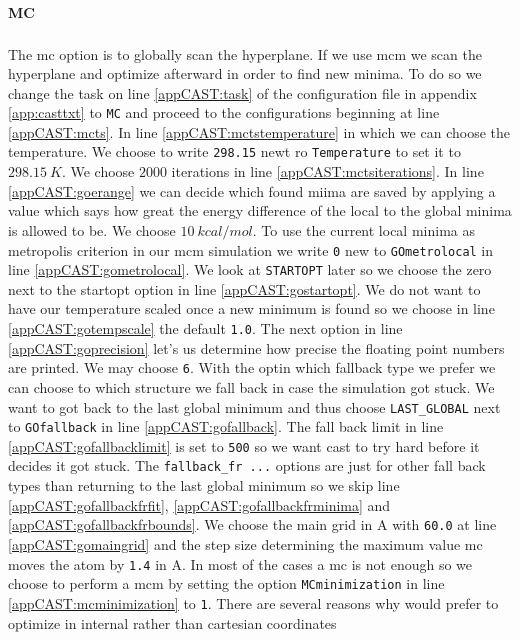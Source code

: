 \documentclass[a4paper,11pt]{scrartcl}
\newcommand{\myCite}[1]{\textsuperscript{\cite{#1}}}
\begin{document}
\paragraph{MC}The \ac{mc}\myCite{MC} option is to globally scan the hyperplane. If we use \ac{mcm} we scan the hyperplane and optimize afterward in order to find new minima. To do so we change the task on line \ref{appCAST:task} of the configuration file in appendix \ref{app:casttxt} to \texttt{MC} and proceed to the configurations beginning at line \ref{appCAST:mcts}. In line \ref{appCAST:mctstemperature} in which we can choose the temperature. We choose to write \texttt{298.15} newt ro \texttt{Temperature} to set it to $298.15~K$. We choose $2000$ iterations in line \ref{appCAST:mctsiterations}. In line \ref{appCAST:goerange} we can decide which found miima are saved by applying a value which says how great the energy difference of the local to the global minima is allowed to be. We choose $10~kcal/mol$. To use the current local minima as metropolis criterion in our \ac{mcm} simulation we write \texttt{0} new to \texttt{GOmetrolocal} in line \ref{appCAST:gometrolocal}. We look at \texttt{STARTOPT} later so we choose the zero next to the startopt option in line \ref{appCAST:gostartopt}. We do not want to have our temperature scaled once a new minimum is found so we choose in line \ref{appCAST:gotempscale} the default \texttt{1.0}. The next option in line \ref{appCAST:goprecision} let's us determine how precise the floating point numbers are printed. We may choose \texttt{6}. With the optin which fallback type we prefer we can choose to which structure we fall back in case the simulation got stuck. We want to got back to the last global minimum and thus choose \texttt{LAST\_GLOBAL} next to \texttt{GOfallback} in line \ref{appCAST:gofallback}. The fall back limit in line \ref{appCAST:gofallbacklimit} is set to \texttt{500} so we want \ac{cast} to try hard before it decides it got stuck. The \texttt{fallback\_fr ...} options are just for other fall back types than returning to the last global minimum so we skip line \ref{appCAST:gofallbackfrfit}, \ref{appCAST:gofallbackfrminima} and \ref{appCAST:gofallbackfrbounds}. We choose the main grid in \ac{A} with \texttt{60.0} at line \ref{appCAST:gomaingrid} and the step size determining the maximum value \ac{mc} moves the atom by \texttt{1.4} in \ac{A}. In most of the cases a \ac{mc} is not enough so we choose to perform a \ac{mcm} by setting the option \texttt{MCminimization} in line \ref{appCAST:mcminimization} to \texttt{1}. There are several reasons why would prefer to optimize in internal rather than cartesian coordinates %
\end{document}
